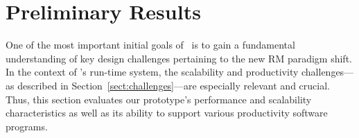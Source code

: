 \section{Preliminary Results}
\label{sec:results}
One of the most important initial goals of \flux\ is to gain
a fundamental understanding of key design challenges pertaining
to the new RM paradigm shift.
In the context of \flux's run-time system, the scalability
and productivity
challenges---as described in Section~\ref{sect:challenges}---are especially
relevant and crucial. 
Thus, this section evaluates our prototype's performance
and scalability characteristics as well as its ability
to support various productivity software programs. 




